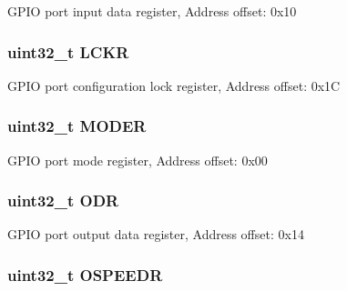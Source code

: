 G\-P\-I\-O port input data register, Address offset\-: 0x10 \hypertarget{struct_g_p_i_o___type_def_a2612a0f4b3fbdbb6293f6dc70105e190}{
\subsubsection[{L\-C\-K\-R}]{ uint32\-\_\-t L\-C\-K\-R}}\label{struct_g_p_i_o___type_def_a2612a0f4b3fbdbb6293f6dc70105e190}
G\-P\-I\-O port configuration lock register, Address offset\-: 0x1\-C \hypertarget{struct_g_p_i_o___type_def_a2b671a94c63a612f81e0e9de8152d01c}{
\subsubsection[{M\-O\-D\-E\-R}]{ uint32\-\_\-t M\-O\-D\-E\-R}}\label{struct_g_p_i_o___type_def_a2b671a94c63a612f81e0e9de8152d01c}
G\-P\-I\-O port mode register, Address offset\-: 0x00 \hypertarget{struct_g_p_i_o___type_def_abff7fffd2b5a718715a130006590c75c}{
\subsubsection[{O\-D\-R}]{ uint32\-\_\-t O\-D\-R}}\label{struct_g_p_i_o___type_def_abff7fffd2b5a718715a130006590c75c}
G\-P\-I\-O port output data register, Address offset\-: 0x14 \hypertarget{struct_g_p_i_o___type_def_a328d16cc6213783ede54e4059ffd50a3}{
\subsubsection[{O\-S\-P\-E\-E\-D\-R}]{ uint32\-\_\-t O\-S\-P\-E\-E\-D\-R}}\label{struct_g_p_i_o___type_def_a328d16cc6213783ede54e4059ffd50a3}

